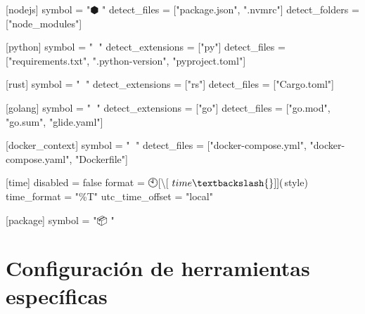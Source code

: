 \documentclass[
  11pt,
  letterpaper,
  oneside,
  openany]{scrbook}
\newenvironment{Shaded}{}{}
\newcommand{\ConstantTok}[1]{\textcolor[rgb]{0.00,0.36,0.77}{#1}}
\newcommand{\DataTypeTok}[1]{\textcolor[rgb]{0.84,0.23,0.29}{#1}}
\newcommand{\KeywordTok}[1]{\textcolor[rgb]{0.84,0.23,0.29}{#1}}
\newcommand{\OperatorTok}[1]{\textcolor[rgb]{0.14,0.16,0.18}{#1}}
\newcommand{\StringTok}[1]{\textcolor[rgb]{0.01,0.18,0.38}{#1}}
\newcommand{\VerbatimStringTok}[1]{\textcolor[rgb]{0.01,0.18,0.38}{#1}}
\begin{document}
\begin{Shaded}
\begin{Highlighting}[]
\KeywordTok{[nodejs]}
\DataTypeTok{symbol} \OperatorTok{=} \StringTok{"⬢ "}
\DataTypeTok{detect\_files} \OperatorTok{=} \OperatorTok{[}\StringTok{"package.json"}\OperatorTok{,} \StringTok{".nvmrc"}\OperatorTok{]}
\DataTypeTok{detect\_folders} \OperatorTok{=} \OperatorTok{[}\StringTok{"node\_modules"}\OperatorTok{]}

\KeywordTok{[python]}
\DataTypeTok{symbol} \OperatorTok{=} \StringTok{"🐍 "}
\DataTypeTok{detect\_extensions} \OperatorTok{=} \OperatorTok{[}\StringTok{"py"}\OperatorTok{]}
\DataTypeTok{detect\_files} \OperatorTok{=} \OperatorTok{[}\StringTok{"requirements.txt"}\OperatorTok{,} \StringTok{".python{-}version"}\OperatorTok{,} \StringTok{"pyproject.toml"}\OperatorTok{]}

\KeywordTok{[rust]}
\DataTypeTok{symbol} \OperatorTok{=} \StringTok{"🦀 "}
\DataTypeTok{detect\_extensions} \OperatorTok{=} \OperatorTok{[}\StringTok{"rs"}\OperatorTok{]}
\DataTypeTok{detect\_files} \OperatorTok{=} \OperatorTok{[}\StringTok{"Cargo.toml"}\OperatorTok{]}

\KeywordTok{[golang]}
\DataTypeTok{symbol} \OperatorTok{=} \StringTok{"🐹 "}
\DataTypeTok{detect\_extensions} \OperatorTok{=} \OperatorTok{[}\StringTok{"go"}\OperatorTok{]}
\DataTypeTok{detect\_files} \OperatorTok{=} \OperatorTok{[}\StringTok{"go.mod"}\OperatorTok{,} \StringTok{"go.sum"}\OperatorTok{,} \StringTok{"glide.yaml"}\OperatorTok{]}

\KeywordTok{[docker\_context]}
\DataTypeTok{symbol} \OperatorTok{=} \StringTok{"🐳 "}
\DataTypeTok{detect\_files} \OperatorTok{=} \OperatorTok{[}\StringTok{"docker{-}compose.yml"}\OperatorTok{,} \StringTok{"docker{-}compose.yaml"}\OperatorTok{,} \StringTok{"Dockerfile"}\OperatorTok{]}

\KeywordTok{[time]}
\DataTypeTok{disabled} \OperatorTok{=} \ConstantTok{false}
\DataTypeTok{format} \OperatorTok{=} \StringTok{\textquotesingle{}}\VerbatimStringTok{🕙[\textbackslash{}[ $time \textbackslash{}]]($style) }\StringTok{\textquotesingle{}}
\DataTypeTok{time\_format} \OperatorTok{=} \StringTok{"\%T"}
\DataTypeTok{utc\_time\_offset} \OperatorTok{=} \StringTok{"local"}

\KeywordTok{[package]}
\DataTypeTok{symbol} \OperatorTok{=} \StringTok{"📦 "}
\end{Highlighting}
\end{Shaded}

\section{Configuración de herramientas
específicas}\label{configuraciuxf3n-de-herramientas-especuxedficas}
\end{document}
